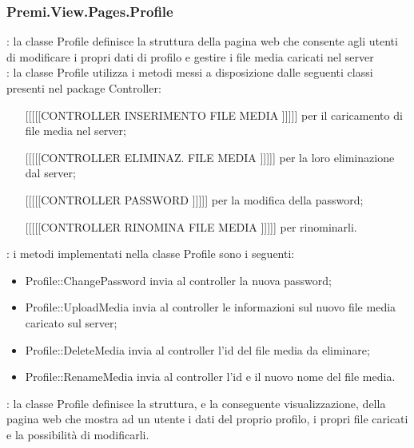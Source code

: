 {		\subsubsection{Premi.View.Pages.Profile}{
			\textbf{\tipo}: la classe Profile definisce la struttura della pagina web che consente agli utenti di modificare i propri dati di profilo e gestire i file media caricati nel server \\
			\textbf{\relaz}: la classe Profile utilizza i metodi messi a disposizione dalle seguenti classi presenti nel package Controller:
			\begin{itemize}
				\item [[[[[[CONTROLLER INSERIMENTO FILE MEDIA]]]]]] per il caricamento di file media nel server;
				\item [[[[[[CONTROLLER ELIMINAZ. FILE MEDIA]]]]]] per la loro eliminazione dal server;
				\item [[[[[[CONTROLLER PASSWORD]]]]]] per la modifica della password;
				\item [[[[[[CONTROLLER RINOMINA FILE MEDIA]]]]]] per rinominarli.
			\end{itemize}
			\textbf{\interfacce}: i metodi implementati nella classe Profile sono i seguenti:
			\begin{itemize}
				\item Profile::ChangePassword invia al controller la nuova password;
				\item Profile::UploadMedia invia al controller le informazioni sul nuovo file media caricato sul server;
				\item Profile::DeleteMedia invia al controller l'id del file media da eliminare;
				\item Profile::RenameMedia invia al controller l'id e il nuovo nome del file media.
			\end{itemize}
			\textbf{\attivita}: la classe Profile definisce la struttura, e la conseguente visualizzazione, della pagina web che mostra ad un utente i dati del proprio profilo, i propri file caricati e la possibilità di modificarli.\\
		}
}
